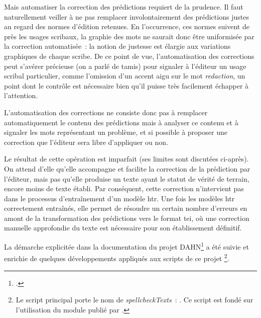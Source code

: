 \documentclass[a4paper,12pt,twoside]{book}
\begin{document}
			Mais automatiser la correction des \glspl{prédiction} requiert de la prudence. Il faut naturellement veiller à ne pas remplacer involontairement des \glspl{prédiction} justes au regard des normes d'édition retenues. En l'occurrence, ces normes suivent de près les usages scribaux, la graphie des mots ne saurait donc être uniformisée par la correction automatisée~: la notion de justesse est élargie aux variations graphiques de chaque scribe. De ce point de vue, l'automatisation des corrections peut s'avérer précieuse (on a parlé de tamis) pour signaler à l'éditeur un usage scribal particulier, comme l'omission d'un accent aigu sur le mot \textit{redaction}, un point dont le contrôle est nécessaire bien qu'il puisse très facilement échapper à l'attention.
			
			L'automatisation des corrections ne consiste donc pas à remplacer automatiquement le contenu des \glspl{prédiction} mais à analyser ce contenu et à signaler les mots représentant un problème, et si possible à proposer une correction que l'éditeur sera libre d'appliquer ou non.
			
			Le résultat de cette opération est imparfait (ses limites sont discutées ci-après). On attend d'elle qu'elle accompagne et facilite la correction de la \gls{prédiction} par l'éditeur, mais pas qu'elle produise un texte ayant le statut de vérité de terrain, encore moins de texte établi. Par conséquent, cette correction n'intervient pas dans le processus d'entraînement d'un modèle \gls{htr}. Une fois les modèles \gls{htr} correctement entraînés, elle permet de résoudre un certain nombre d'erreurs en amont de la transformation des \glspl{prédiction} vers le format \gls{tei}, où une correction manuelle approfondie du texte est nécessaire pour son établissement définitif.
			
			La démarche explicitée dans la documentation du projet DAHN\footcite{chiffoleauHowPostOCRCorrection2022} a été suivie et enrichie de quelques développements appliqués aux scripts de ce projet
			\footnote{Le script principal porte le nom de \textit{spellcheckTexts}~: \cite{biaySpellcheckTextsPy2022}. Ce script est fondé sur l'utilisation du module publié par \cite{barrusPyspellcheckerPurePython}.}.
					
\end{document}
